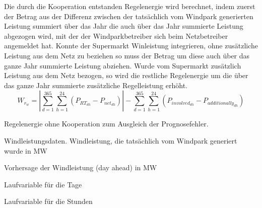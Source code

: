 Die durch die Kooperation entstanden Regelenergie wird berechnet, indem zuerst
der Betrag aus der Differenz zwischen der tats\"achlich vom Windpark generierten
Leistung summiert \"uber das Jahr die auch \"uber das Jahr summierte Leistung
abgezogen wird, mit der der Windparkbetreiber sich beim Netzbetreiber angemeldet
hat. Konnte der Supermarkt Winleistung integrieren, ohne zus\"atzliche Leistung
aus dem Netz zu beziehen so muss der Betrag um diese auch \"uber das ganze Jahr
summierte Leistung abziehen. Wurde vom Supermarkt zus\"atzlich Leistung aus dem
Netz bezogen, so wird die restliche Regelenergie um die \"uber das ganze Jahr
summierte zus\"atzliche Regelleistung erh\"oht.
\begin{equation}
	W_{r_{w}} = |\sum^{365}_{d=1}\sum^{24}_{h=1}(P_{RT_{dh}}-P_{net_{dh}})| -
	\sum^{365}_{d=1}\sum^{24}_{h=1}(P_{involved_{dh}} - P_{additionally_{dh}})
\label{eq:wrw}
\end{equation}
\begin{description}[\dth]
\item[$W_{r_{wo}}$] Regelenergie ohne Kooperation zum Ausgleich der
Prognosefehler.
\item[$P_{RT}$] Windleistungsdaten. Windleistung, die tats\"achlich vom
Windpark generiert wurde in MW
\item[$P_{DA}$] Vorhersage der Windleistung (day ahead) in MW
\item[$d$] Laufvariable f\"ur die Tage
\item[$h$] Laufvariable f\"ur die Stunden
\end{description}

